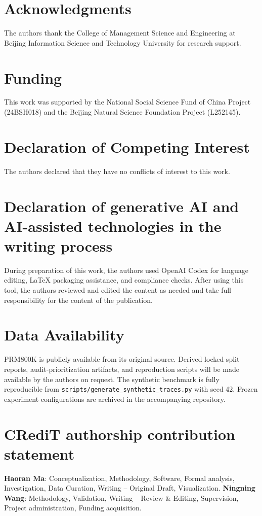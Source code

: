 \documentclass[a4paper,fleqn]{cas-sc}
\begin{document}
\section*{Acknowledgments}
The authors thank the College of Management Science and Engineering at Beijing Information Science and Technology University for research support.

\section*{Funding}
This work was supported by the National Social Science Fund of China Project (24BSH018) and the Beijing Natural Science Foundation Project (L252145).

\section*{Declaration of Competing Interest}
The authors declared that they have no conflicts of interest to this work.

\section*{Declaration of generative AI and AI-assisted technologies in the writing process}
During preparation of this work, the authors used OpenAI Codex for language editing, LaTeX packaging assistance, and compliance checks. After using this tool, the authors reviewed and edited the content as needed and take full responsibility for the content of the publication.

\section*{Data Availability}
PRM800K is publicly available from its original source. Derived locked-split reports, audit-prioritization artifacts, and reproduction scripts will be made available by the authors on request. The synthetic benchmark is fully reproducible from \texttt{scripts/generate\_synthetic\_traces.py} with seed 42. Frozen experiment configurations are archived in the accompanying repository.

\section*{CRediT authorship contribution statement}
\textbf{Haoran Ma}: Conceptualization, Methodology, Software, Formal analysis, Investigation, Data Curation, Writing -- Original Draft, Visualization. \textbf{Ningning Wang}: Methodology, Validation, Writing -- Review \& Editing, Supervision, Project administration, Funding acquisition.




\end{document}
